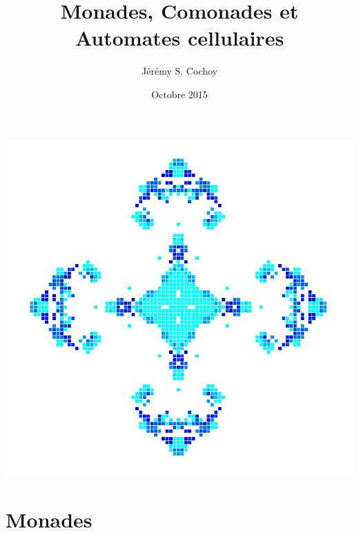 \documentclass{beamer}
\begin{document}
\title{Monades, Comonades et Automates cellulaires}
\author{Jérémy S. Cochoy}
\date{Octobre 2015}


\begin{frame}
\titlepage
\end{frame}

\begin{frame}
\tableofcontents
\end{frame}

\begin{frame}

\begin{center}
\includegraphics[scale=0.3]{screen1.png}
\end{center}

\end{frame}

\section{Monades}
\end{document}

